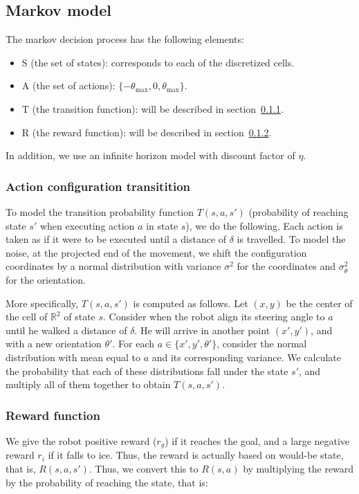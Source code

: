 \documentclass[a4paper]{article}
\begin{document}
\subsection{Markov model}
The markov decision process has the following elements:
\begin{itemize}
  \item S (the set of states): corresponds to each of the discretized cells.
  \item A (the set of actions): $\{-\theta_\text{max}, 0, \theta_\text{max}\}$.
  \item T (the transition function): will be described in section~\ref{sec:t}.
  \item R (the reward function): will be described in section~\ref{sec:r}.
\end{itemize}

In addition, we use an infinite horizon model with discount factor of $\eta$.

\subsubsection{Action configuration transitition}
\label{sec:t}
To model the transition probability function $T(s, a, s')$ (probability of
reaching state $s'$ when executing action $a$ in state $s$), we do the following.
Each action is taken as if it were to be executed until a distance of $\delta$
is travelled. To model the noise, at the projected end of the movement, we
shift the configuration coordinates by a normal distribution with variance
$\sigma^2$ for the coordinates and $\sigma_\theta^2$ for the orientation.

More specifically, $T(s, a, s')$ is computed as follows. Let $(x, y)$ be the
center of the cell of $\mathbb{R}^2$ of state $s$. Consider when the robot
align its steering angle to $a$ until he walked a distance of $\delta$. He
will arrive in another point $(x', y')$, and with a new orientation $\theta'$.
For each $a \in \{x', y', \theta'\}$, consider the normal distribution
with mean equal to $a$ and its corresponding variance. We calculate the probability
that each of these distributions fall under the state $s'$, and multiply all
of them together to obtain $T(s, a, s')$.

\subsubsection{Reward function}
\label{sec:r}
We give the robot positive reward ($r_g$) if it reaches the goal, and a large negative
reward $r_i$ if it falls to ice. Thus, the reward is actually based on would-be state,
that is, $R(s, a, s')$. Thus, we convert this to $R(s, a)$ by multiplying the
reward by the probability of reaching the state, that is:
\end{document}
